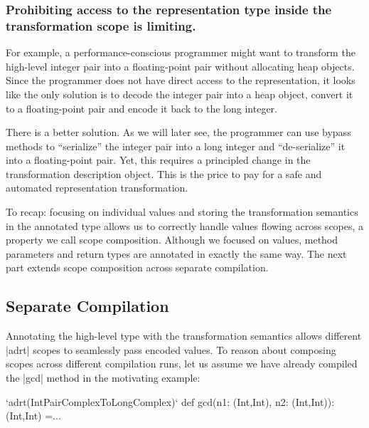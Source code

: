 \vspace{-0.2em}
\subsubsection{Prohibiting access to the representation type inside the transformation scope is limiting.} For example, a per\-for\-mance-conscious programmer might want to transform the high-level integer pair into a floating-point pair without allocating heap objects. Since the programmer does not have direct access to the representation, it looks like the only solution is to decode the integer pair into a heap object, convert it to a floating-point pair and encode it back to the long integer.

There is a better solution. As we will later see, the programmer can use bypass methods to ``serialize'' the integer pair into a long integer and ``de-serialize'' it into a floating-point pair. Yet, this requires a principled change in the transformation description object. This is the price to pay for a safe and automated representation transformation.

To recap: focusing on individual values and storing the transformation semantics in the annotated type allows us to correctly handle values flowing across scopes, a property we call scope composition. Although we focused on values, method parameters and return types
are annotated in exactly the same way. The next part extends scope composition across separate compilation.


\vspace{-0.5em}
\subsection{Separate Compilation}
\label{sec:ildl:separate-compilation}
\vspace{-0.3em}

Annotating the high-level type with the transformation semantics allows different |adrt| scopes to seamlessly pass encoded values. To reason about composing scopes across different compilation runs, let us assume we have already compiled the |gcd| method in the motivating example:

\begin{lstlisting-nobreak}
`adrt(IntPairComplexToLongComplex)` {
  def gcd(n1: (Int,Int), n2: (Int,Int)): (Int,Int) =...
}
\end{lstlisting-nobreak}

